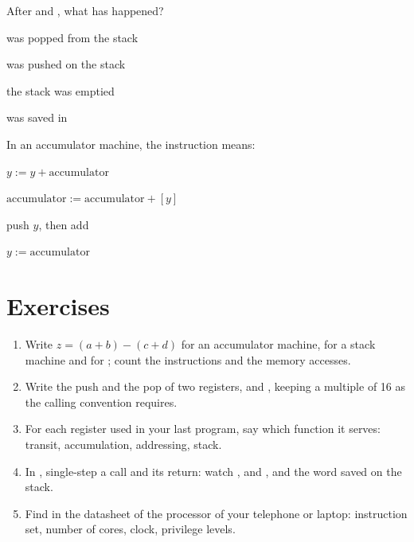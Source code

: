 \begin{quiz}{After  and , what has happened?}
\item {} was popped from the stack
\item {} was pushed on the stack
\item the stack was emptied
\item {} was saved in 
\end{quiz}

\begin{quiz}{In an accumulator machine, the instruction  means:}
\item $y := y + \text{accumulator}$
\item $\text{accumulator} := \text{accumulator} + [y]$
\item push $y$, then add
\item $y := \text{accumulator}$
\end{quiz}

\section{Exercises}

\begin{exercise}
\begin{enumerate}[nosep]
\item Write $z=(a+b)-(c+d)$ for an accumulator machine, for a stack machine
  and for \riscv; count the instructions and the memory accesses.
\item Write the push and the pop of two registers,  and ,
  keeping  a multiple of 16 as the calling convention requires.
\item For each register used in your last \prg program, say which function it
  serves: transit, accumulation, addressing, stack.
\item In \prgqt, single-step a call and its return: watch , 
  and , and the word saved on the stack.
\item Find in the datasheet of the processor of your telephone or laptop:
  instruction set, number of cores, clock, privilege levels.
\end{enumerate}
\end{exercise}

